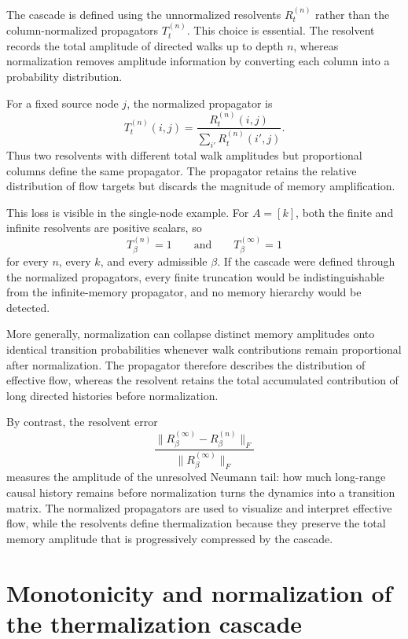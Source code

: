 \documentclass[aps,superscriptaddress,11pt]{revtex4-2}
\theoremstyle{definition}
\theoremstyle{plain}
\begin{document}
The cascade is defined using the unnormalized resolvents $R_t^{(n)}$ rather
than the column-normalized propagators $T_t^{(n)}$. This choice is
essential. The resolvent records the total amplitude of directed walks up to
depth $n$, whereas normalization removes amplitude information by converting
each column into a probability distribution.

For a fixed source node $j$, the normalized propagator is
\[
  T_t^{(n)}(i,j)
  =
  \frac{R_t^{(n)}(i,j)}
       {\sum_{i'}R_t^{(n)}(i',j)}.
\]
Thus two resolvents with different total walk amplitudes but proportional
columns define the same propagator. The propagator retains the relative
distribution of flow targets but discards the magnitude of memory
amplification.

This loss is visible in the single-node example. For $A=[k]$, both the
finite and infinite resolvents are positive scalars, so
\[
  T_\beta^{(n)}=1
  \qquad\text{and}\qquad
  T_\beta^{(\infty)}=1
\]
for every $n$, every $k$, and every admissible $\beta$. If the cascade were
defined through the normalized propagators, every finite truncation would be
indistinguishable from the infinite-memory propagator, and no memory
hierarchy would be detected. 

More generally, normalization can collapse distinct memory amplitudes onto
identical transition probabilities whenever walk contributions remain
proportional after normalization. The propagator therefore describes the
distribution of effective flow, whereas the resolvent retains the
total accumulated contribution of long directed histories before
normalization.

By contrast, the resolvent error
\[
  \frac{\|R_\beta^{(\infty)}-R_\beta^{(n)}\|_F}
       {\|R_\beta^{(\infty)}\|_F}
\]
measures the amplitude of the unresolved Neumann tail: how much long-range
causal history remains before normalization turns the dynamics into a
transition matrix. The normalized propagators are used to visualize and
interpret effective flow, while the resolvents define thermalization because
they preserve the total memory amplitude that is progressively compressed by
the cascade.

\section{Monotonicity and normalization of the thermalization cascade}
\label{sec:monotonicity}
\end{document}
